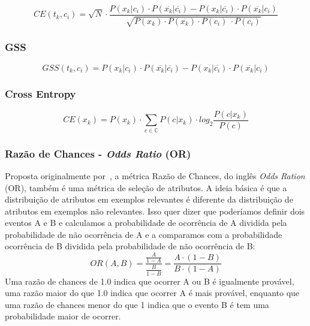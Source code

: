 \cite{Ng97}
\begin{equation}\label{eqn::ce}
   CE(t_k, c_i) = \sqrt{N} \cdot \frac{ P(x_k|c_i) \cdot P(\overline{x_k}|\overline{c_i}) - P(x_k|\overline{c_i}) \cdot P(\overline{x_k}|c_i) } {\sqrt{ P(x_k) \cdot P(\overline{x_k}) \cdot P(c_i) \ \cdot P(\overline{c_i}) } }
\end{equation}


\subsubsection{GSS}
\label{subsubsection::gss}

\begin{equation}\label{eqn::gss}
   GSS(t_k, c_i) = P(x_k|c_i) \cdot P(\overline{x_k}|\overline{c_i}) - P(x_k|\overline{c_i}) \cdot P(\overline{x_k}|c_i) 
\end{equation}

\subsubsection{Cross Entropy}
\label{subsubsection::}
\cite{Shang07}
\begin{equation}\label{eqn::ce}
   CE(x_k) =  P(x_k) \cdot \sum_{c \in \mathbb{C}} P(c|x_k) \cdot log_2 \frac{ P(c|x_k) } { P(c) }
\end{equation}



\subsubsection{Razão de Chances - \textit{Odds Ratio} (OR)}
\label{subsubsection::or}

Proposta originalmente por~\cite{Rijsbergen79}, a métrica Razão de Chances, do inglês \textit{Odds Ration} (OR), também é uma métrica de seleção de atributos. A ideia básica é que a distribuição de atributos em exemplos relevantes é diferente da distribuição de atributos em exemplos não relevantes. Isso quer dizer que poderíamos definir dois eventos A e B e calculamos a probabilidade de ocorrência de A dividida pela probabilidade de não ocorrência de A e a comparamos com a probabilidade ocorrência de B dividida pela probabilidade de não ocorrência de B:
\begin{equation}\label{eqn::or}
   OR(A, B) = \frac{\frac{A}{1-A}} {\frac{B}{1-B}} = \frac{ A \cdot ( 1 - B )} { B \cdot ( 1 - A ) } 
\end{equation}
Uma razão de chances de 1.0 indica que ocorrer A ou B é igualmente provável, uma razão maior do que 1.0 indica que ocorrer A é mais provável, enquanto que uma razão de chances menor do que 1 indica que o evento B é tem uma probabilidade maior de ocorrer.

